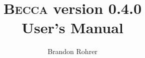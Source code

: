 \documentclass[12pt,oneside]{book}
\begin{document}
\title{\textsc{Becca} version 0.4.0 \\User's Manual}
\author{Brandon Rohrer}

\maketitle
\tableofcontents
\newpage

\addtolength{\parskip}{\baselineskip}

\setcounter{tocdepth}{0}











%

%

\appendix

%

%

%



\end{document}
